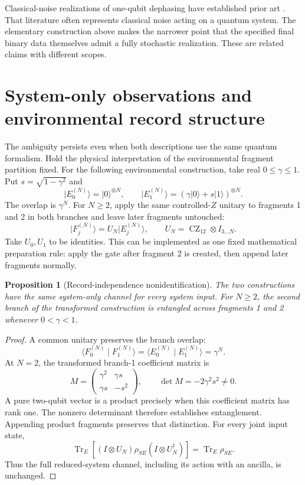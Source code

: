 \documentclass[11pt,letterpaper]{article}
\newtheorem{proposition}[theorem]{Proposition}
\newcommand{\Tr}{\operatorname{Tr}}
\newcommand{\ip}[2]{\langle #1\mid #2\rangle}
\newcommand{\ket}[1]{\lvert #1\rangle}
\begin{document}
Classical-noise realizations of one-qubit dephasing have established prior art \cite{crow}. That literature often represents classical noise acting on a quantum system. The elementary construction above makes the narrower point that the specified final binary data themselves admit a fully stochastic realization. These are related claims with different scopes.

\section{System-only observations and environmental record structure}

The ambiguity persists even when both descriptions use the same quantum formalism. Hold the physical interpretation of the environmental fragment partition fixed. For the following environmental construction, take real $0\le\gamma\le1$. Put $s=\sqrt{1-\gamma^2}$ and
\[
 \ket{E_0^{(N)}}=\ket0^{\otimes N},\qquad
 \ket{E_1^{(N)}}=(\gamma\ket0+s\ket1)^{\otimes N}.
\]
The overlap is $\gamma^N$. For $N\ge2$, apply the same controlled-$Z$ unitary to fragments 1 and 2 in both branches and leave later fragments untouched:
\[
 \ket{F_j^{(N)}}=U_N\ket{E_j^{(N)}},\qquad
 U_N=\operatorname{CZ}_{12}\otimes I_{3\ldots N}.
\]
Take $U_0,U_1$ to be identities. This can be implemented as one fixed mathematical preparation rule: apply the gate after fragment 2 is created, then append later fragments normally.

\begin{proposition}[Record-independence nonidentification]
The two constructions have the same system-only channel for every system input. For $N\geq2$, the second branch of the transformed construction is entangled across fragments 1 and 2 whenever $0<\gamma<1$.
\end{proposition}
\begin{proof}
A common unitary preserves the branch overlap:
\[
 \ip{F_0^{(N)}}{F_1^{(N)}}=\ip{E_0^{(N)}}{E_1^{(N)}}=\gamma^N.
\]
At $N=2$, the transformed branch-1 coefficient matrix is
\[
 M=\begin{pmatrix}\gamma^2&\gamma s\\\gamma s&-s^2\end{pmatrix},
 \qquad\det M=-2\gamma^2s^2\ne0.
\]
A pure two-qubit vector is a product precisely when this coefficient matrix has rank one. The nonzero determinant therefore establishes entanglement. Appending product fragments preserves that distinction. For every joint input state,
\[
 \Tr_E\!\left[(I\otimes U_N)\rho_{SE}(I\otimes U_N^\dagger)\right]
 =\Tr_E\rho_{SE}.
\]
Thus the full reduced-system channel, including its action with an ancilla, is unchanged.
\end{proof}
\end{document}

